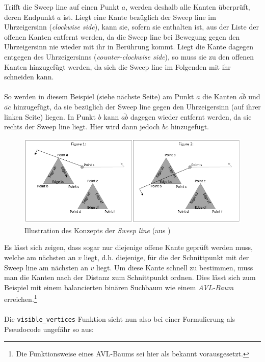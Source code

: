 \documentclass[a4paper, notitlepage, 12pt]{scrartcl}
\begin{document}
 Trifft die Sweep line auf einen Punkt $a$, werden deshalb alle Kanten überprüft, deren Endpunkt $a$ ist. Liegt eine Kante bezüglich der Sweep line im Uhrzeigersinn (\emph{clockwise side}), kann sie, sofern sie enthalten ist, aus der Liste der offenen Kanten entfernt werden, da die Sweep line bei Bewegung gegen den Uhrzeigersinn nie wieder mit ihr in Berührung kommt. Liegt die Kante dagegen entgegen des Uhrzeigersinns (\emph{counter-clockwise side}), so muss sie zu den offenen Kanten hinzugefügt werden, da sich die Sweep line im Folgenden mit ihr schneiden kann. \\ \\
 So werden in diesem Beispiel (siehe nächste Seite) am Punkt $a$ die Kanten $\overline{ab}$ und $\overline{ac}$ hinzugefügt, da sie bezüglich der Sweep line gegen den Uhrzeigersinn (auf ihrer linken Seite) liegen. In Punkt $b$ kann $\overline{ab}$ dagegen wieder entfernt werden, da sie rechts der Sweep line liegt. Hier wird dann jedoch $\overline{bc}$ hinzugefügt.
  \begin{figure}[H]
 	\centering \includegraphics[scale=0.6]{pics/lee_figure1}
 	\caption{Illustration des Konzepts der \emph{Sweep line} (aus \cite{Src:pyvistwo})}
 \end{figure}
Es lässt sich zeigen, dass sogar nur diejenige offene Kante geprüft werden muss, welche am nächsten an $v$ liegt, d.h. diejenige, für die der Schnittpunkt mit der Sweep line am nächsten an $v$ liegt. Um diese Kante schnell zu bestimmen, muss man die Kanten nach der Distanz zum Schnittpunkt ordnen. Dies lässt sich zum Beispiel mit einem balancierten binären Suchbaum wie einem \emph{AVL-Baum} erreichen.\footnote{Die Funktionsweise eines AVL-Baums sei hier als bekannt vorausgesetzt.}\cite{Src:pyvistwo} \\ \\
Die \texttt{visible\_vertices}-Funktion sieht nun also bei einer Formulierung als Pseudocode ungefähr so aus:
\end{document}
